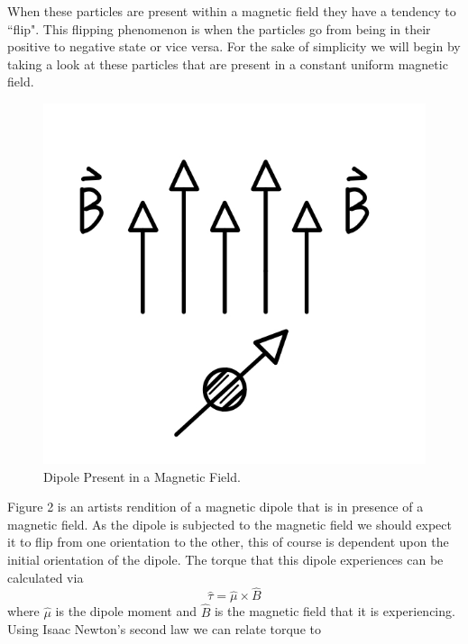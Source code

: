 \documentclass[twocolumn]{article}
\begin{document}
When these particles are present within a magnetic field they have a tendency to ``flip". This flipping phenomenon is when the particles go from being in their positive to negative state or vice versa. For the sake of simplicity we will begin by taking a look at these particles that are present in a constant uniform magnetic field.
\begin{figure}[htbp]
\begin{center}
\includegraphics[width=0.75\linewidth]{Dipole-In-Magnetic-Field.PNG}
\caption{Dipole Present in a Magnetic Field.}
\end{center}
\end{figure}
\newline
Figure 2 is an artists rendition of a magnetic dipole that is in presence of a magnetic field. As the dipole is subjected to the magnetic field we should expect it to flip from one orientation to the other, this of course is dependent upon the initial orientation of the dipole. The torque that this dipole experiences can be calculated via
\begin{equation}
\hat{\tau}=\hat{\mu} \times \hat{B}
\end{equation}
where $\hat{\mu}$ is the dipole moment and $\hat{B}$ is the magnetic field that it is experiencing. Using Isaac Newton's second law we can relate torque to
\end{document}
